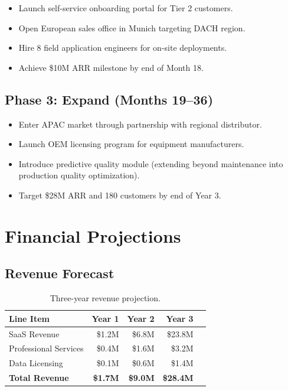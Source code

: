 \documentclass[
    language=english,
    doctype=business-plan,
    institution=none,
]{../../omnilatex}
\begin{document}
\begin{itemize}
    \item Launch self-service onboarding portal for Tier 2 customers.
    \item Open European sales office in Munich targeting DACH region.
    \item Hire 8 field application engineers for on-site deployments.
    \item Achieve \$10M ARR milestone by end of Month 18.
\end{itemize}

\subsection{Phase 3: Expand (Months 19--36)}

\begin{itemize}
    \item Enter APAC market through partnership with regional distributor.
    \item Launch OEM licensing program for equipment manufacturers.
    \item Introduce predictive quality module (extending beyond maintenance
          into production quality optimization).
    \item Target \$28M ARR and 180 customers by end of Year 3.
\end{itemize}

\section{Financial Projections}

\subsection{Revenue Forecast}

\begin{table}[h]
    \centering
    \begin{tabular}{lrrrr}
        \toprule
        \textbf{Line Item} & \textbf{Year 1} & \textbf{Year 2} & \textbf{Year 3} \\
        \midrule
        SaaS Revenue         & \$1.2M  & \$6.8M  & \$23.8M \\
        Professional Services & \$0.4M  & \$1.6M  & \$3.2M  \\
        Data Licensing        & \$0.1M  & \$0.6M  & \$1.4M  \\
        \midrule
        \textbf{Total Revenue} & \textbf{\$1.7M} & \textbf{\$9.0M} & \textbf{\$28.4M} \\
        \bottomrule
    \end{tabular}
    \caption{Three-year revenue projection.}
\end{table}
\end{document}

